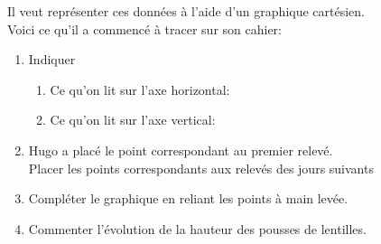 \documentclass[12pt,a4paper]{article}
\begin{document}
\begin{minipage}{0.5\textwidth}
Il veut représenter ces données à l’aide d’un graphique cartésien.\\
Voici ce qu’il a commencé à tracer sur son cahier:
\begin{enumerate}
\item Indiquer
	\begin{enumerate}
		\item Ce qu’on lit sur l’axe horizontal:\\
		\item Ce qu’on lit sur l’axe vertical:\\
	\end{enumerate}
	\item Hugo a placé le point correspondant au premier relevé.\\
	Placer les points correspondants aux relevés des jours suivants
	\item Compléter le graphique en reliant les points à main levée.
	\item Commenter l’évolution de la hauteur des pousses de lentilles.
\end{enumerate}
\end{minipage}
\begin{minipage}{0.4\textwidth}
\end{minipage}
\end{document}

